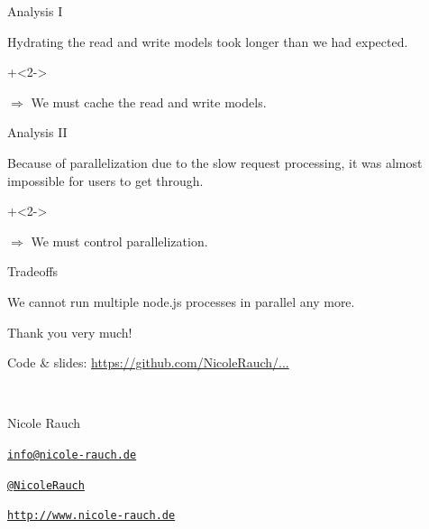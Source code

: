 \begin{frame}[fragile]{Analysis I}

Hydrating the read and write models took longer than we had expected.
                  
\onslide+<2->
                  
\vspace{3em}

$\Longrightarrow$ We must cache the read and write models.
                  
\end{frame}

\begin{frame}[fragile]{Analysis II}

Because of parallelization due to the slow request processing, it was almost impossible for users to get through.

\onslide+<2->
                  
\vspace{3em}

$\Longrightarrow$ We must control parallelization.
                  
\end{frame}







\begin{frame}[fragile]{Tradeoffs}

We cannot run multiple node.js processes in parallel any more.

\end{frame}


\begin{frame}{Thank you very much!}

        Code \& slides: \url{https://github.com/NicoleRauch/...}
        
        ~\\[1em]
        \begin{block}{Nicole Rauch}
        \begin{description}[Twitterxx]
                \item[E-Mail]  \href{mailto:info@nicole-rauch.de}{\texttt{info@nicole-rauch.de}}
                \item[Twitter] \href{http://twitter.com/NicoleRauch}{\texttt{@NicoleRauch}}
                \item[Web] \href{http://www.nicole-rauch.de}{\texttt{http://www.nicole-rauch.de}}
        \end{description}
        \end{block}
\end{frame}

